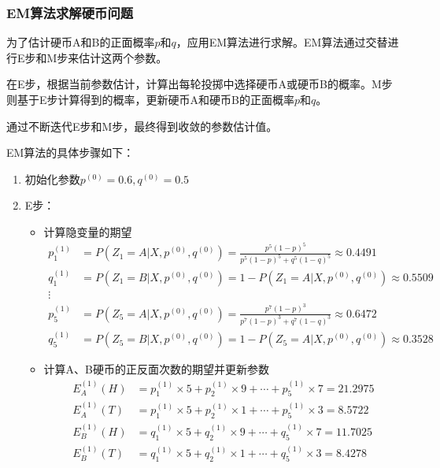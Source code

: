 \documentclass[a4paper,12pt]{ctexart} %
\begin{document}
\subsubsection{EM算法求解硬币问题}
为了估计硬币A和B的正面概率$p$和$q$，应用EM算法进行求解。EM算法通过交替进行E步和M步来估计这两个参数。

在E步，根据当前参数估计，计算出每轮投掷中选择硬币A或硬币B的概率。M步则基于E步计算得到的概率，更新硬币A和硬币B的正面概率$p$和$q$。

通过不断迭代E步和M步，最终得到收敛的参数估计值。

EM算法的具体步骤如下：
\begin{enumerate}
    \item 初始化参数$p^{(0)} = 0.6, q^{(0)} = 0.5$
    \item E步：
    \begin{itemize}
        \item 计算隐变量的期望
        \begin{align*}
            p_1^{(1)} &= P(Z_1=A|X,p^{(0)},q^{(0)}) = \frac{p^{5}(1-p)^5}{p^5(1-p)^{5} + q^{5}(1-q)^5}  \approx 0.4491 \\
            q_1^{(1)} &= P(Z_1=B|X,p^{(0)},q^{(0)}) = 1-  P(Z_1=A|X,p^{(0)},q^{(0)})\approx 0.5509 \\
            \vdots \nonumber \\
            p_5^{(1)} &= P(Z_5=A|X,p^{(0)},q^{(0)}) =\frac{p^{7}(1-p)^3}{p^7(1-p)^{3} + q^{7}(1-q)^3} \approx 0.6472 \\
            q_5^{(1)} &= P(Z_5=B|X,p^{(0)},q^{(0)}) = 1-  P(Z_5=A|X,p^{(0)},q^{(0)})\approx 0.3528 
        \end{align*}

        \item 计算A、B硬币的正反面次数的期望并更新参数
        \begin{align*}
        E^{(1)}_A(H) &= p_1^{(1)} \times 5 + p_2^{(1)} \times 9 + \cdots + p_5^{(1)} \times 7 = 21.2975 \\
        E^{(1)}_A(T) &= p_1^{(1)} \times 5 + p_2^{(1)} \times 1 + \cdots + p_5^{(1)} \times 3 = 8.5722 \\
        E^{(1)}_B(H) &= q_1^{(1)} \times 5 + q_2^{(1)} \times 9 + \cdots + q_5^{(1)} \times 7 = 11.7025\\
        E^{(1)}_B(T) &= q_1^{(1)} \times 5 + q_2^{(1)} \times 1 + \cdots + q_5^{(1)} \times 3 = 8.4278 
        \end{align*}
    \end{itemize}
    

\end{enumerate}
\end{document}
